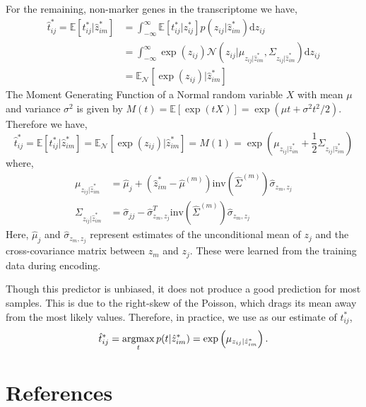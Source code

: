 \documentclass[10pt]{article}
\newcommand{\argmax}{\operatornamewithlimits{argmax}}
\begin{document}
For the remaining, non-marker genes in the transcriptome we have,
\begin{align*}
\hat{t}_{ij}^* = \mathbb{E}[t^*_{ij}  | \hat{z}^*_{im}] & =  \int_{-\infty}^\infty \mathbb{E}[t^*_{ij} | z^*_{ij}] p(z_{ij} | \hat{z}^*_{im})  \textrm{d}z_{ij} \\
& = \int_{-\infty}^\infty \exp(z_{ij}) \mathcal{N}(z_{ij} | \mu_{z_{ij} | \hat{z}_{im}^* }, \Sigma_{z_{ij} | \hat{z}_{im}^* }) \textrm{d}z_{ij} \\
& = \mathbb{E}_{\mathcal{N}}[\exp(z_{ij}) | \hat{z}^*_{im}]
\end{align*}
The Moment Generating Function of a Normal random variable $X$ with mean $\mu$ and variance $\sigma^2$ is given by $M(t) = \mathbb{E}[\exp(tX)] = \exp(\mu t + \sigma^2t^2/2)$. Therefore we have, 
\[
\hat{t}_{ij}^* = \mathbb{E}[t^*_{ij}  | \hat{z}^*_{im}] = \mathbb{E}_{\mathcal{N}}[\exp(z_{ij}) | \hat{z}^*_{im}] = M(1) = \exp \left( \mu_{z_{ij} | \hat{z}_{im}^* } + \frac{1}{2}\Sigma_{z_{ij} | \hat{z}_{im}^* } \right)
\]
where, 
\begin{align*}
\mu_{z_{ij} | \hat{z}^*_{im}} &=  \hat{\mu}_j + \left( \hat{z}^*_{im}- \hat{\mu}^{(m)} \right)\textrm{inv}\left( \hat{\Sigma}^{(m)} \right)\hat{\sigma}_{z_{m},z_j} \\
\Sigma_{z_{ij} | \hat{z}^*_{im}} &=  \hat{\sigma}_{jj} -  \hat{\sigma}_{z_{m},z_j}^T\textrm{inv}\left( \hat{\Sigma}^{(m)} \right)\hat{\sigma}_{z_{m},z_j}
\end{align*}
Here, $\hat{\mu}_j $ and $\hat{\sigma}_{z_{m},z_j}$ represent estimates of the unconditional mean of $z_j$ and the cross-covariance matrix between $z_m$ and $z_j$. These were learned from the training data during encoding.

Though this predictor is unbiased, it does not produce a good prediction for most samples. This is due to the right-skew of the Poisson, which drags its mean away from the most likely values. Therefore, in practice, we use as our estimate of $t^*_{ij}$,
\[
\hat{t}^*_{ij} = \argmax_{t} p(t |  \hat{z}^*_{im})  = \exp\left( \mu_{z_{ij} | \hat{z}^*_{im}}  \right).
\]


\section{References}

\end{document}
